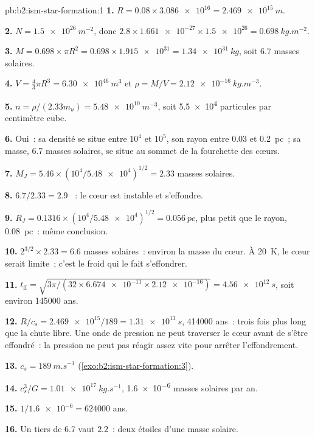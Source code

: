 \begin{solution}{pb:b2:ism-star-formation:1}
\textbf{1.} $R = 0.08\times\num{3.086e16} = \qty{2.469e15}{m}$.

\textbf{2.} $N = \qty{1.5e26}{m^{-2}}$, donc $2.8\times\num{1.661e-27}\times\num{1.5e26} =
\qty{0.698}{kg.m^{-2}}$.

\textbf{3.} $M = 0.698\times\pi R^2 = 0.698\times\num{1.915e31} = \qty{1.34e31}{kg}$,
soit $6.7$ masses solaires.

\textbf{4.} $V = \tfrac43\pi R^3 = \qty{6.30e46}{m^3}$ et
$\rho = M/V = \qty{2.12e-16}{kg.m^{-3}}$.

\textbf{5.} $n = \rho/(2.33m_u) = \qty{5.48e10}{m^{-3}}$, soit \num{5.5e4} particules
par centimètre cube.

\textbf{6.} Oui~: sa densité se situe entre $10^4$ et $10^5$, son rayon entre 0.03 et
\qty{0.2}{pc}~; sa masse, 6.7 masses solaires, se situe au sommet de la fourchette des cœurs.

\textbf{7.} $M_J = 5.46\times(10^4/\num{5.48e4})^{1/2} = 2.33$ masses solaires.

\textbf{8.} $6.7/2.33 = 2.9$ ~: le cœur est instable et s'effondre.

\textbf{9.} $R_J = 0.1316\times(10^4/\num{5.48e4})^{1/2} = \qty{0.056}{pc}$, plus petit que
le rayon, \qty{0.08}{pc}~: même conclusion.

\textbf{10.} $2^{3/2}\times2.33 = 6.6$ masses solaires~: environ la masse du cœur. À
\qty{20}{K}, le cœur serait limite~; c'est le froid qui le fait s'effondrer.

\textbf{11.} $t_{\mathrm{ff}} = \sqrt{3\pi/(32\times\num{6.674e-11}\times\num{2.12e-16})}
= \qty{4.56e12}{s}$, soit environ \num{145000} ans.

\textbf{12.} $R/c_s = \num{2.469e15}/189 = \qty{1.31e13}{s}$, \num{414000} ans~: trois
fois plus long que la chute libre. Une onde de pression ne peut traverser le cœur avant
de s'être effondré~: la pression ne peut pas réagir assez vite pour arrêter l'effondrement.

\textbf{13.} $c_s = \qty{189}{m.s^{-1}}$ (\cref{exo:b2:ism-star-formation:3}).

\textbf{14.} $c_s^3/G = \qty{1.01e17}{kg.s^{-1}}$, \num{1.6e-6} masses solaires par an.

\textbf{15.} $1/\num{1.6e-6} = \num{624000}$ ans.

\textbf{16.} Un tiers de 6.7 vaut $2.2$~: deux étoiles d'une masse solaire.


\end{solution}
